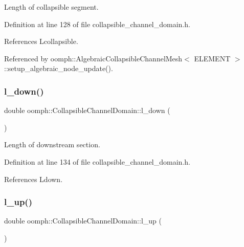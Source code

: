 Length of collapsible segment. 



Definition at line 128 of file collapsible\+\_\+channel\+\_\+domain.\+h.



References Lcollapsible.



Referenced by oomph\+::\+Algebraic\+Collapsible\+Channel\+Mesh$<$ E\+L\+E\+M\+E\+N\+T $>$\+::setup\+\_\+algebraic\+\_\+node\+\_\+update().

\mbox{\label{classoomph_1_1CollapsibleChannelDomain_a93dc02b16ab1cbab2f42f62d0a7aeb8e}} 
\subsubsection{\texorpdfstring{l\+\_\+down()}{l\_down()}}
{\footnotesize\ttfamily double oomph\+::\+Collapsible\+Channel\+Domain\+::l\+\_\+down (\begin{DoxyParamCaption}{ }\end{DoxyParamCaption})\hspace{0.3cm}{\ttfamily [inline]}}



Length of downstream section. 



Definition at line 134 of file collapsible\+\_\+channel\+\_\+domain.\+h.



References Ldown.

\mbox{\label{classoomph_1_1CollapsibleChannelDomain_a3773afa34e21e3e4ed7a86cf42808dd7}} 
\subsubsection{\texorpdfstring{l\+\_\+up()}{l\_up()}}
{\footnotesize\ttfamily double oomph\+::\+Collapsible\+Channel\+Domain\+::l\+\_\+up (\begin{DoxyParamCaption}{ }\end{DoxyParamCaption})\hspace{0.3cm}{\ttfamily [inline]}}



